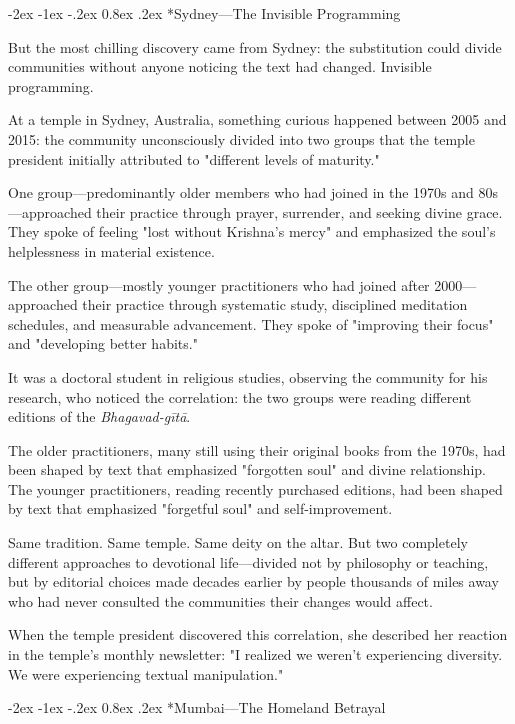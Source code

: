\documentclass[12pt,twoside]{book}
\makeatletter
\let\oldsubsection\subsection
\renewcommand{\subsection}[1]{\needspace{3\baselineskip}\oldsubsection{#1}}
\renewcommand\subsection{\@startsection{subsection}{2}{\z@}%
{-2ex \@plus -1ex \@minus -.2ex}%
{0.8ex \@plus .2ex}%
{\normalfont\large\bfseries}}
\makeatother
\begin{document}
\vspace{0.1cm}
\subsection*{Sydney—The Invisible Programming}

But the most chilling discovery came from Sydney: the substitution could divide communities without anyone noticing the text had changed. Invisible programming.

At a temple in Sydney, Australia, something curious happened between 2005 and 2015: the community unconsciously divided into two groups that the temple president initially attributed to "different levels of maturity."

One group—predominantly older members who had joined in the 1970s and 80s—approached their practice through prayer, surrender, and seeking divine grace. They spoke of feeling "lost without Krishna's mercy" and emphasized the soul's helplessness in material existence.

The other group—mostly younger practitioners who had joined after 2000—approached their practice through systematic study, disciplined meditation schedules, and measurable advancement. They spoke of "improving their focus" and "developing better habits."

It was a doctoral student in religious studies, observing the community for his research, who noticed the correlation: the two groups were reading different editions of the \emph{Bhagavad-gītā}.

The older practitioners, many still using their original books from the 1970s, had been shaped by text that emphasized "forgotten soul" and divine relationship. The younger practitioners, reading recently purchased editions, had been shaped by text that emphasized "forgetful soul" and self-improvement.

Same tradition. Same temple. Same deity on the altar. But two completely different approaches to devotional life—divided not by philosophy or teaching, but by editorial choices made decades earlier by people thousands of miles away who had never consulted the communities their changes would affect.

When the temple president discovered this correlation, she described her reaction in the temple's monthly newsletter: "I realized we weren't experiencing diversity. We were experiencing textual manipulation."

\vspace{0.1cm}
\subsection*{Mumbai—The Homeland Betrayal}
\end{document}
